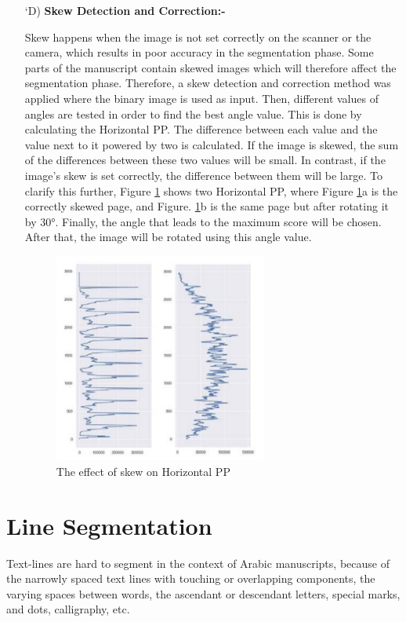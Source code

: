 \begin{itemize}[labelindent=1em,labelsep=0.25cm,leftmargin=*]
        \item[\char `D)] \textbf{Skew Detection and Correction:-}
        
        Skew happens when the image is not set correctly on the
        scanner or the camera, which results in poor accuracy in the
        segmentation phase.
        Some parts of the manuscript contain skewed images which
        will therefore affect the segmentation phase. Therefore, a skew
        detection and correction method was applied where the binary
        image is used as input. Then, different values of angles are
        tested in order to find the best angle value. This is done by
        calculating the Horizontal PP. The difference between each
        value and the value next to it powered by two is calculated. If
        the image is skewed, the sum of the differences between these
        two values will be small. In contrast, if the image’s skew is
        set correctly, the difference between them will be large. To
        clarify this further, Figure \ref{fig:skew} shows two Horizontal PP, where
        Figure \ref{fig:skew}a is the correctly skewed page, and Figure. \ref{fig:skew}b is the same
        page but after rotating it by 30°. Finally, the angle that leads
        to the maximum score will be chosen. After that, the image
        will be rotated using this angle value.
        \begin{figure}[!htb]
            \centering
            \includegraphics[width=7cm]{images/skew.png}
            \caption{The effect of skew on Horizontal PP}
            \label{fig:skew}
        \end{figure}
    \end{itemize}

\clearpage

\section{Line Segmentation}
Text-lines are hard to segment in the context of Arabic manuscripts, because of the narrowly spaced text lines with touching or overlapping components, the varying spaces between words, the ascendant or descendant letters, special marks, and dots, calligraphy, etc.\\

